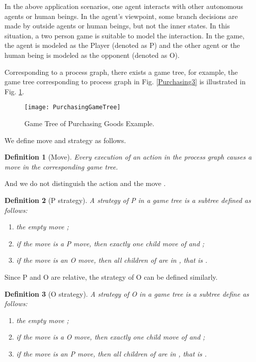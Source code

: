 \documentclass{fac}
\newtheorem{definition}{Definition}[section]
\begin{document}
In the above application scenarios, one agent interacts with other autonomous agents or human beings. In the agent's viewpoint, some branch decisions are made by outside agents or human beings, but not the inner states. In this situation, a two person game is suitable to model the interaction. In the game, the agent is modeled as the Player (denoted as P) and the other agent or the human being is modeled as the opponent (denoted as O).

Corresponding to a process graph, there exists a game tree, for example, the game tree corresponding to process graph in Fig. \ref{Purchasing3} is illustrated in Fig. \ref{PurchasingGameTree}.

\begin{figure}
  \centering
\texttt{[image: PurchasingGameTree]}
  \caption{Game Tree of Purchasing Goods Example.}
  \label{PurchasingGameTree}
\end{figure}

We define move and strategy as follows.

\begin{definition}[Move]
Every execution of an action  in the process graph causes a move  in the corresponding game tree.
\end{definition}

And we do not distinguish the action  and the move .

\begin{definition}[P strategy]
A strategy  of P in a game tree is a subtree defined as follows:

\begin{enumerate}
  \item the empty move ;
  \item if the move  is a P move, then exactly one child move  of  and ;
  \item if the move  is an O move, then all children  of  are in , that is .
\end{enumerate}
\end{definition}

Since P and O are relative, the strategy  of O can be defined similarly.

\begin{definition}[O strategy]
A strategy  of O in a game tree is a subtree define as follows:

\begin{enumerate}
  \item the empty move ;
  \item if the move  is a O move, then exactly one child move  of  and ;
  \item if the move  is an P move, then all children  of  are in , that is .
\end{enumerate}
\end{definition}
\end{document}
